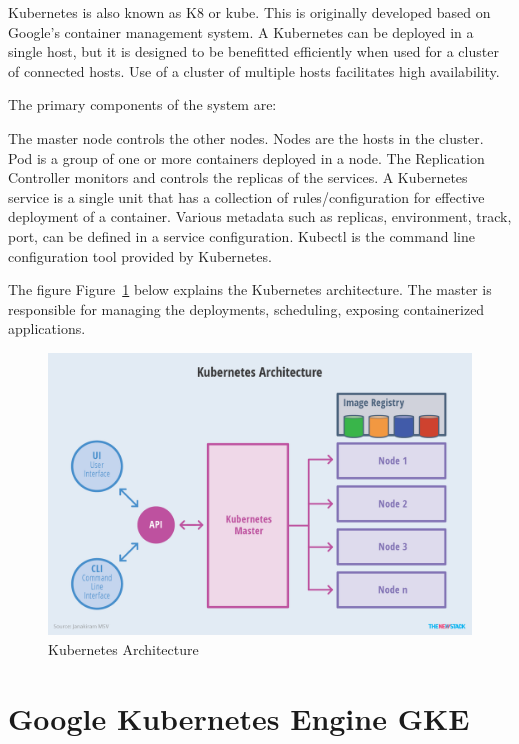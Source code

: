 Kubernetes is also known as K8 or kube. This is originally developed based on 
Google's container management system. A Kubernetes can be deployed in a single 
host, but it is designed to be benefitted efficiently when used for a cluster 
of connected hosts. Use of a cluster of multiple hosts facilitates high 
availability.


The primary components of the system are: 

The master node controls the other nodes. Nodes are the hosts in the cluster. 
Pod is a group of one or more containers deployed in a node.  The Replication
 Controller monitors and controls the replicas of the services. A Kubernetes 
 service is a single unit that has a collection of rules/configuration for 
 effective deployment of a container. Various metadata such as replicas, 
 environment, track, port, can be defined in a service configuration. 
 Kubectl is the command line configuration tool provided by Kubernetes. 

The figure Figure~\ref{fig:kube-archtecture} below explains the Kubernetes 
architecture. The master is responsible for managing the deployments, 
scheduling, exposing containerized applications.

\begin{figure}[htb]
	\centering\includegraphics[width=\columnwidth]
        {images/hid_417_Kubernetes-Architecture.png}
  \caption{Kubernetes Architecture~\cite{hid-sp18-417-kubernetes}}
  \label{fig:kube-archtecture}
\end{figure}

\section{ Google Kubernetes Engine GKE}

